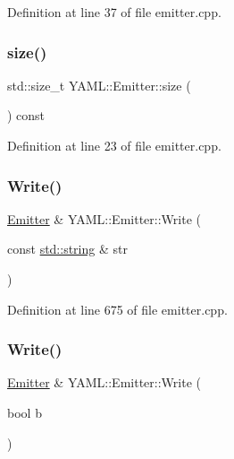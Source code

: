 Definition at line 37 of file emitter.\+cpp.

\mbox{\label{class_y_a_m_l_1_1_emitter_a53d12ff62ad4cd6e5b898f8014f85fd6}} 
\subsubsection{\texorpdfstring{size()}{size()}}
{\footnotesize\ttfamily std\+::size\+\_\+t Y\+A\+M\+L\+::\+Emitter\+::size (\begin{DoxyParamCaption}{ }\end{DoxyParamCaption}) const}



Definition at line 23 of file emitter.\+cpp.

\mbox{\label{class_y_a_m_l_1_1_emitter_afabf2909ddfbbb793420a2e94b50f45e}} 
\subsubsection{\texorpdfstring{Write()}{Write()}\hspace{0.1cm}{\footnotesize\ttfamily [1/9]}}
{\footnotesize\ttfamily \mbox{\hyperlink{class_y_a_m_l_1_1_emitter}{Emitter}} \& Y\+A\+M\+L\+::\+Emitter\+::\+Write (\begin{DoxyParamCaption}\item[{const \mbox{\hyperlink{glad_8h_ac83513893df92266f79a515488701770}{std\+::string}} \&}]{str }\end{DoxyParamCaption})}



Definition at line 675 of file emitter.\+cpp.

\mbox{\label{class_y_a_m_l_1_1_emitter_a2296002f7510291dbce7ce87589f1e7d}} 
\subsubsection{\texorpdfstring{Write()}{Write()}\hspace{0.1cm}{\footnotesize\ttfamily [2/9]}}
{\footnotesize\ttfamily \mbox{\hyperlink{class_y_a_m_l_1_1_emitter}{Emitter}} \& Y\+A\+M\+L\+::\+Emitter\+::\+Write (\begin{DoxyParamCaption}\item[{bool}]{b }\end{DoxyParamCaption})}




